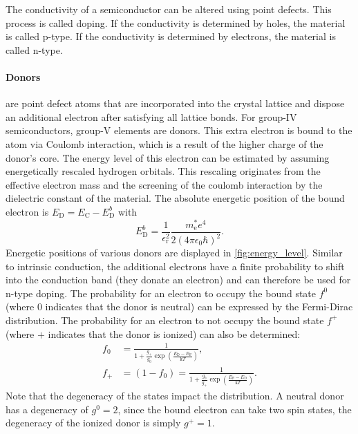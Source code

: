 The conductivity of a semiconductor can be altered using
point defects.
This process is called doping.
If the conductivity is determined by holes, the material is
called p-type.
If the conductivity is determined by electrons, the material
is called n-type.

\paragraph{Donors} are point defect atoms that are incorporated into the crystal
lattice and dispose an additional electron after satisfying all
lattice bonds.
For group-$\mathrm{IV}$ semiconductors, group-$\mathrm{V}$ elements
are donors.
This extra electron is bound to the atom via Coulomb interaction,
which is a result of the higher charge of the donor's core.
The energy level of this electron can be estimated by assuming
energetically rescaled hydrogen orbitals.
This rescaling originates from the effective electron mass and
the screening of the coulomb interaction by the dielectric constant
of the material.
The absolute energetic position of the bound electron is
$E_{\mathrm{D}}=E_{\mathrm{C}}-E_{\mathrm{D}}^{b}$ with
\begin{equation}
	E_{\mathrm{D}}^{b}=
	\frac{1}{\epsilon_{\mathrm{r}}^{2}}
	\frac{m_{\mathrm{e}}^{*} e^{4}}{2(4\pi\epsilon_{0}\hbar)^{2}}.
\end{equation}
Energetic positions of various donors are displayed in
\cref{fig:energy_level}.
Similar to intrinsic conduction, the additional electrons have a
finite probability to shift into the conduction band
(they donate an electron) and
can therefore be used for n-type doping.
The probability for an electron to occupy the bound state $f^0$
(where $0$ indicates that the donor is neutral) can be expressed
by the Fermi-Dirac distribution.
The probability for an electron to not occupy the bound state $f^+$
(where $+$ indicates that the donor is ionized) can also be
determined:
\begin{align}
	f_{0} & =\frac{1}{1+\frac{g_{+}}{g_{0}}\exp\left(
	\frac{E_{\mathrm{D}}-E_{\mathrm{F}}}{\mathrm{k}T}\right)},  \\
	\label{eq:fplus}
	f_{+} & =(1-f_{0})=\frac{1}{1+\frac{g_{0}}{g_{+}}\exp\left(
		\frac{E_{\mathrm{F}}-E_{\mathrm{D}}}{\mathrm{k}T} \right)}.
\end{align}
Note that the degeneracy of the states impact the distribution.
A neutral donor has a degeneracy of $g^0=2$, since the bound
electron can take two spin states, the degeneracy of the
ionized donor is simply $g^+=1$.

